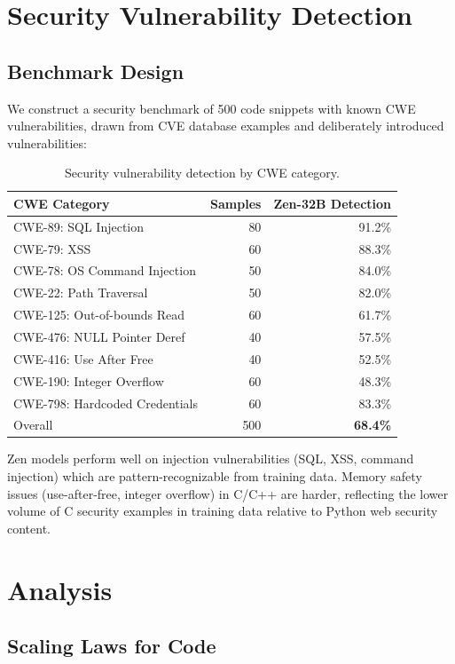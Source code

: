 \documentclass[11pt,a4paper]{article}
\begin{document}
\section{Security Vulnerability Detection}

\subsection{Benchmark Design}

We construct a security benchmark of 500 code snippets with known CWE vulnerabilities,
drawn from CVE database examples and deliberately introduced vulnerabilities:

\begin{table}[H]
\centering
\begin{tabular}{lrr}
\toprule
\textbf{CWE Category} & \textbf{Samples} & \textbf{Zen-32B Detection} \\
\midrule
CWE-89: SQL Injection & 80 & 91.2\% \\
CWE-79: XSS & 60 & 88.3\% \\
CWE-78: OS Command Injection & 50 & 84.0\% \\
CWE-22: Path Traversal & 50 & 82.0\% \\
CWE-125: Out-of-bounds Read & 60 & 61.7\% \\
CWE-476: NULL Pointer Deref & 40 & 57.5\% \\
CWE-416: Use After Free & 40 & 52.5\% \\
CWE-190: Integer Overflow & 60 & 48.3\% \\
CWE-798: Hardcoded Credentials & 60 & 83.3\% \\
\midrule
Overall & 500 & \textbf{68.4\%} \\
\bottomrule
\end{tabular}
\caption{Security vulnerability detection by CWE category.}
\end{table}

Zen models perform well on injection vulnerabilities (SQL, XSS, command injection)
which are pattern-recognizable from training data. Memory safety issues (use-after-free,
integer overflow) in C/C++ are harder, reflecting the lower volume of C security
examples in training data relative to Python web security content.

\section{Analysis}

\subsection{Scaling Laws for Code}
\end{document}
